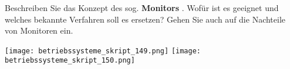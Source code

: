 \documentclass{article}
\begin{document}
\begin{tcolorbox}[colback=white!10!white,colframe=lightgray!75!black,
  savelowerto=\jobname_ex.tex]

\begin{center}
Beschreiben Sie das Konzept des sog. 
\textbf{Monitors
}. Wofür ist es geeignet und welches bekannte Verfahren soll es ersetzen?
Gehen Sie auch auf die Nachteile von Monitoren ein.

\end{center}

\tcblower

\justifying
\texttt{[image: betriebssysteme\_skript\_149.png]}
\texttt{[image: betriebssysteme\_skript\_150.png]}

\end{tcolorbox}
\end{document}
